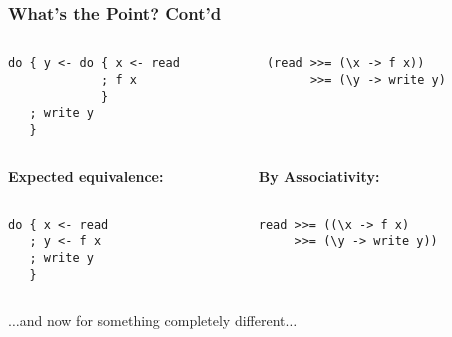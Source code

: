 \documentclass{beamer}
\begin{document}
\begin{frame}[fragile]
\frametitle{What's the Point? Cont'd}
\begin{columns}[t]
{
  \begin{column}{5cm}
\begin{lstlisting}
do { y <- do { x <- read
             ; f x
             }
   ; write y    
   }   
\end{lstlisting}
  \end{column}
  }
  {
  \begin{column}{5cm}
\begin{lstlisting}
(read >>= (\x -> f x)) 
      >>= (\y -> write y)
      
\end{lstlisting}
  \end{column}
  }
\end{columns}
\begin{columns}[t]
  \begin{column}{5cm}
{
  \textbf{Expected equivalence:}
\begin{lstlisting}

do { x <- read
   ; y <- f x
   ; write y 
   }
\end{lstlisting}
}
  \end{column}
  \begin{column}{5cm}
{
\textbf{By Associativity:}
\begin{lstlisting}

read >>= ((\x -> f x) 
     >>= (\y -> write y))
\end{lstlisting}
}
  \end{column}
\end{columns}
\end{frame}


\begin{frame}
\large{$\dots$and now for something completely different$\dots$}
\end{frame}



\end{document}
